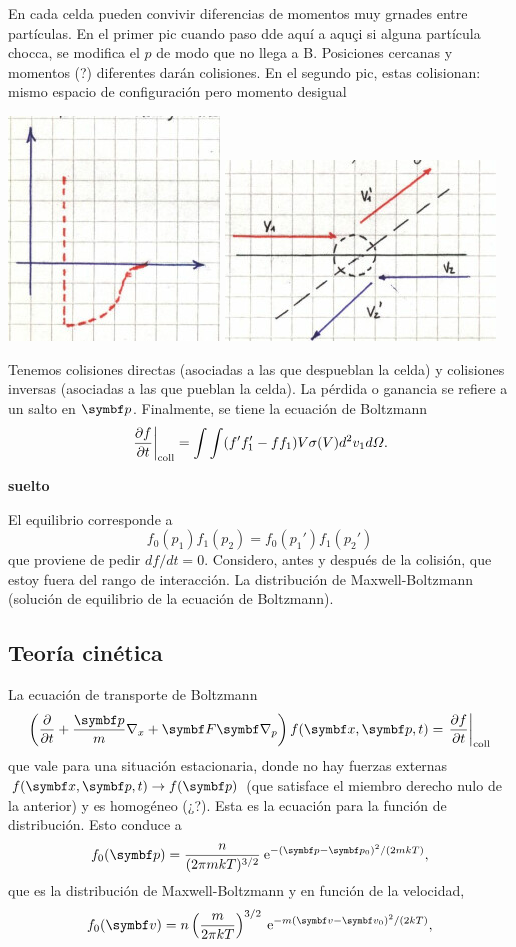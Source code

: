 \documentclass[10pt,oneside]{CBFT_book}
\begin{document}
En cada celda pueden convivir diferencias de momentos muy grnades entre partículas.
En el primer pic cuando paso dde aquí a aquçi si alguna partícula chocca, se modifica el $p$ de modo
que no llega a B. Posiciones cercanas y momentos (?) diferentes darán colisiones. 
En el segundo pic, estas colisionan: mismo espacio de configuración pero momento desigual

\includegraphics[scale=0.5]{images/1606329237.jpg}
\includegraphics[scale=0.5]{images/1606329239.jpg}

Tenemos colisiones directas (asociadas a las que despueblan la celda) y colisiones inversas (asociadas
a las que pueblan la celda). La pérdida o ganancia se refiere a un salto en $\vb{p}$.
Finalmente, se tiene la ecuación de Boltzmann
\[
	\left.\frac{\partial^{\hspace{-0.05em}} {f}}{\partial {t}^{\hspace{-0.05em}}}\right|_{\text{coll}} = \int \int ( f' f'_1 - f f_1) V \sigma(V) d^2v_1 d\Omega.
\]

{\bf suelto}

El equilibrio corresponde a 
\[
	f_0(p_1) f_1(p_2) = f_0(p_1') f_1(p_2')
\]
que proviene de pedir $df/dt = 0$.
Considero, antes y después de la colisión, que estoy fuera del rango de interacción.
La distribución de Maxwell-Boltzmann (solución de equilibrio de la ecuación de Boltzmann).

\subsection{Teoría cinética}

La ecuación de transporte de Boltzmann
\[
	\left( \dpar{}{t} + \frac{\vbp}{m} \nabla_x + \vb{F}\Nabla_p \right) f(\vbx,\vbp,t) =
	\dpare{f}{t}{\text{coll}} 
\]
que vale para una situación estacionaria, donde no hay fuerzas externas $f(\vbx,\vbp,t) \to f(\vbp) $ 
(que satisface el miembro derecho nulo de la anterior) y es homogéneo (¿?).
Esta es la ecuación para la función de distribución.
Esto conduce a
\[
	f_0(\vbp) = \frac{ n }{( 2 \pi m k T )^{3/2}} \euler^{- (\vbp - \vbp_0)^2 / (2mkT)},
\]
que es la distribución de Maxwell-Boltzmann y en función de la velocidad,
\[
	f_0(\vbv) = n \Frac{ m }{2 \pi k T }^{3/2} \euler^{- m (\vbv - \vbv_0)^2 / (2kT)},
\]
\end{document}
